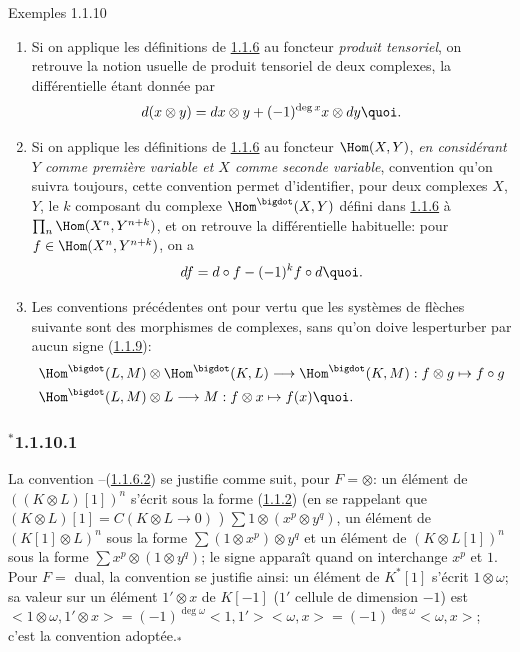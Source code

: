 \documentclass[10pt]{../fichiers-configuration-latex/smfart}
\begin{document}
\begin{enonce*}[remark]{Exemples 1.1.10}
\begin{enumerate}
\renewcommand{\theenumi}{\roman{enumi}}
\renewcommand{\labelenumi}{(\theenumi)}
\item Si on applique les définitions de \hyperref[XVII.subsubsec1.1.6]{1.1.6} au foncteur
  \emph{produit tensoriel}, on retrouve la notion usuelle de produit
  tensoriel de deux complexes, la différentielle étant donnée par
\[
d(x\otimes y)=dx\otimes y+(-1)^{\deg x}x\otimes dy{\quoi}.
\]

\item Si on applique les définitions de \hyperref[XVII.subsubsec1.1.6]{1.1.6} au
  foncteur $\Hom(X,Y)$, \emph{en considérant $Y$ comme première
  variable et $X$ comme seconde variable}, convention qu'on suivra
  toujours, cette convention permet d'identifier, pour deux complexes
  $X$, $Y$, le $k$ composant du complexe $\Hom^{\bigdot}(X,Y)$ défini dans
  \hyperref[XVII.subsubsec1.1.6]{1.1.6} à $\prod_n\Hom(X^{n},Y^{n+k})$, et on retrouve la
  différentielle habituelle: pour $f\in \Hom(X^{n},Y^{n+k})$, on a
\[
df=d\circ f-(-1)^{k}f\circ d{\quoi}.
\]

\item Les conventions précédentes ont pour vertu que les systèmes de
  flèches suivante sont des morphismes de complexes, sans qu'on doive
  les\pageoriginale perturber par aucun signe (\hyperref[XVII.subsubsec1.1.9]{1.1.9}):
\begin{align*}
& \Hom^{\bigdot}(L,M)\otimes \Hom^{\bigdot}(K,L)\longrightarrow
  \Hom^{\bigdot}(K,M):f\otimes g\mapsto f\circ g\\
& \Hom^{\bigdot}(L,M)\otimes L\longrightarrow M: f\otimes x\mapsto f(x){\quoi}.
\end{align*}
\end{enumerate}
\end{enonce*}

\subsubsection*{${}^{\ast}$1.1.10.1}
La convention --(\hyperref[XVII.par1.1.6.2]{1.1.6.2}) se justifie comme suit, pour
$F=\otimes$: un élément de $((K\otimes L)[1])^{n}$ s'écrit sous la
forme (\hyperref[XVII.subsubsec*1.1.2]{1.1.2}) (en se rappelant que $(K\otimes L)[1]=C(K\otimes
L\rightarrow 0)$ ) $\sum 1\otimes(x^{p}\otimes y^{q})$, un
élément de $(K[1]\otimes L)^{n}$ sous la forme $\sum (1\otimes
x^{p})\otimes y^{q}$ et un élément de $(K\otimes L[1])^{n}$ sous la
forme $\sum x^{p}\otimes (1\otimes y^{q})$; le signe apparaît quand
on interchange $x^{p}$ et $1$. Pour $F=$ dual, la convention 
se justifie ainsi: un élément de $K^{\ast}[1]$ s'écrit $1\otimes
\omega$; sa valeur sur un élément $1'\otimes x$ de $K[-1]$ ($1'$
cellule de dimension $-1$) est $<1\otimes \omega, 1'\otimes
x>=(-1)^{\deg\omega}<1, 1'><\omega,x>=(-1)^{\deg\omega}<\omega,x>$;
c'est la convention adoptée.${}_{\ast}$
\end{document}
